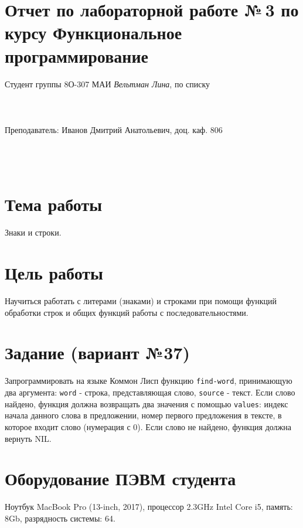 \documentclass[12pt]{article}
\begin{document}
\section*{Отчет по лабораторной работе №\,3 
по курсу \guillemotleft  Функциональное программирование\guillemotright}
\begin{flushright}
Студент группы 8О-307 МАИ \textit{Вельтман Лина},  по списку \\
 \\
 \\
\ \\
Преподаватель: Иванов Дмитрий Анатольевич, доц. каф. 806 \\
 \\
 \\
 \\

\end{flushright}

\section{Тема работы}
Знаки и строки.

\section{Цель работы}
Научиться работать с литерами (знаками) и строками при помощи функций обработки строк и общих функций работы с последовательностями.

\section{Задание (вариант №37)}
Запрограммировать на языке Коммон Лисп функцию {\tt find-word}, принимающую два аргумента:
{\tt word} - строка, представляющая слово,
{\tt source} - текст.
Если слово найдено, функция должна возвращать два значения с помощью {\tt values}:
индекс начала данного слова в предложении,
номер первого предложения в тексте, в которое входит слово (нумерация с 0).
Если слово не найдено, функция должна вернуть NIL.\\


\section{Оборудование ПЭВМ студента}
Ноутбук MacBook Pro (13-inch, 2017), процессор 2.3GHz Intel Core i5, память: 8Gb, разрядность системы: 64.
\end{document}
